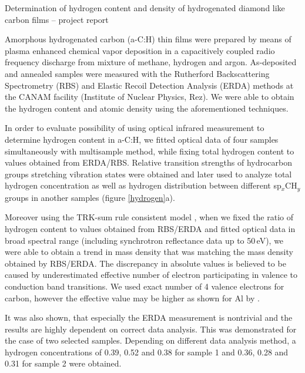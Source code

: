 \documentclass[10pt]{article}
\begin{document}
\pagestyle{empty}

\begin{center}
\LARGE{Determination of hydrogen content and density of hydrogenated diamond like carbon films -- project report}
\end{center}
\vspace{0.1cm}

Amorphous hydrogenated carbon (a-C:H) thin films were prepared by means of plasma enhanced chemical vapor deposition in a capacitively coupled radio frequency discharge from mixture of methane, hydrogen and argon.
As-deposited and annealed samples were measured with the Rutherford Backscattering Spectrometry (RBS) and Elastic Recoil Detection Analysis (ERDA) methods at the CANAM facility (Institute of Nuclear Physics, Rez).
We were able to obtain the hydrogen content and atomic density using the aforementioned techniques.

In order to evaluate possibility of using optical infrared measurement to determine hydrogen content in a-C:H, we fitted optical data of four samples simultaneously with multisample method, while fixing total hydrogen content to values obtained from ERDA/RBS. Relative transition strengths of hydrocarbon groups stretching vibration states were obtained and later used to analyze total hydrogen concentration as well as hydrogen distribution between different sp$_x$CH$_y$ groups in another samples (figure \ref{hydrogen}a).

Moreover using the TRK-sum rule consistent model \cite{Franta2013432}, when we fixed the ratio of hydrogen content to values obtained from RBS/ERDA and fitted optical data in broad spectral range (including synchrotron reflectance data up to 50\,eV), we were able to obtain a trend in mass density that was matching the mass density obtained by RBS/ERDA.
The discrepancy in absolute values is believed to be caused by underestimated effective number of electron participating in valence to conduction band transitions.
We used exact number of 4 valence electrons for carbon, however the effective value may be higher as shown for Al by \citet{Shiles1980}.

It was also shown, that especially the ERDA measurement is nontrivial and the results are highly dependent on correct data analysis. This was demonstrated for the case of two selected samples. Depending on different data analysis method, a hydrogen concentrations of 0.39, 0.52 and 0.38 for sample 1 and 0.36, 0.28 and 0.31 for sample 2 were obtained. 
\end{document}
